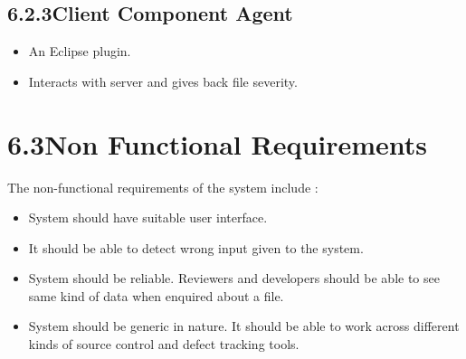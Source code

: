 \documentclass[oneside,a4paper,12pt]{book}
\begin{document}
\begin{Center}
{\fontsize{9pt}{10.8pt}\selectfont \textbf{ }\par}
\end{Center}\par

\setlength{\parskip}{9.96pt}
\subsection*{6.2.3\hspace*{10pt}Client Component Agent}
\setlength{\parskip}{0.0pt}
\begin{itemize}
	\item An Eclipse plugin.\par

	\item Interacts with server and gives back file severity.
\end{itemize}\par

\setlength{\parskip}{9.96pt}
\section*{6.3\hspace*{10pt}Non Functional Requirements}
\begin{justify}
The non-functional requirements of the system include :
\end{justify}\par

\setlength{\parskip}{0.0pt}
\begin{itemize}
	\item System should have suitable user interface.\par

	\item It should be able to detect wrong input given to the system.\par

	\item System should be reliable. Reviewers and developers should be able to see same kind of data when enquired about a file.\par

\setlength{\parskip}{9.96pt}
	\item System should be generic in nature. It should be able to work across different kinds of source control and defect tracking tools.
\end{itemize}\par
\end{document}
